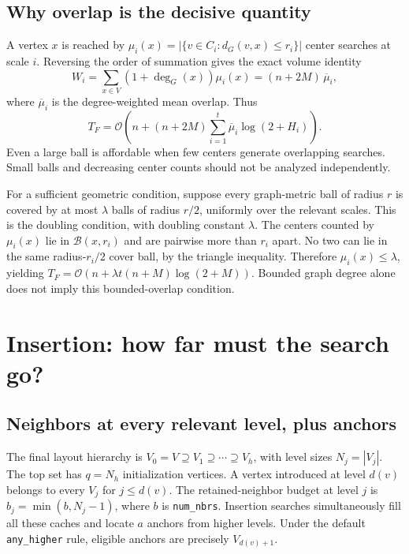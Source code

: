 \documentclass[11pt,a4paper]{article}
\newcommand{\bigO}{\mathcal O}
\newcommand{\ball}{\mathcal B}
\newcommand{\code}[1]{\texttt{#1}}
\begin{document}
\subsection{Why overlap is the decisive quantity}

A vertex $x$ is reached by
$\mu_i(x)=|\{v\in C_i:d_G(v,x)\leq r_i\}|$ center searches at scale $i$.
Reversing the order of summation gives the exact volume identity
\begin{equation}
 W_i=\sum_{x\in V}(1+\deg_G(x))\mu_i(x)
     =(n+2M)\,\overline\mu_i,
 \label{eq:overlap}
\end{equation}
where $\overline\mu_i$ is the degree-weighted mean overlap. Thus
\begin{equation}
 \boxed{T_F=\bigO\!\left(n+(n+2M)
       \sum_{i=1}^{t}\overline\mu_i\log(2+H_i)\right).}
 \label{eq:overlap-bound}
\end{equation}
Even a large ball is affordable when few centers generate overlapping searches.
Small balls and decreasing center counts should not be analyzed independently.

For a sufficient geometric condition, suppose every graph-metric ball of radius
$r$ is covered by at most $\lambda$ balls of radius $r/2$, uniformly over the
relevant scales. This is the doubling condition, with doubling constant
$\lambda$. The centers counted by $\mu_i(x)$ lie in $\ball(x,r_i)$ and are
pairwise more than $r_i$ apart. No two can lie in the same radius-$r_i/2$ cover
ball, by the triangle inequality. Therefore $\mu_i(x)\leq\lambda$, yielding
$T_F=\bigO(n+\lambda t(n+M)\log(2+M))$. Bounded graph degree alone does not
imply this bounded-overlap condition.

\clearpage
\section{Insertion: how far must the search go?}

\subsection{Neighbors at every relevant level, plus anchors}

The final layout hierarchy is $V_0=V\supseteq V_1\supseteq\cdots\supseteq V_h$,
with level sizes $N_j=|V_j|$. The top set has $q=N_h$ initialization vertices.
A vertex introduced at level $d(v)$ belongs to every $V_j$ for $j\leq d(v)$.
The retained-neighbor budget at level $j$ is $b_j=\min(b,N_j-1)$, where
$b$ is \code{num\_nbrs}. Insertion searches simultaneously fill all these caches
and locate $a$ anchors from higher levels. Under the default
\code{any\_higher} rule, eligible anchors are precisely $V_{d(v)+1}$.
\end{document}
